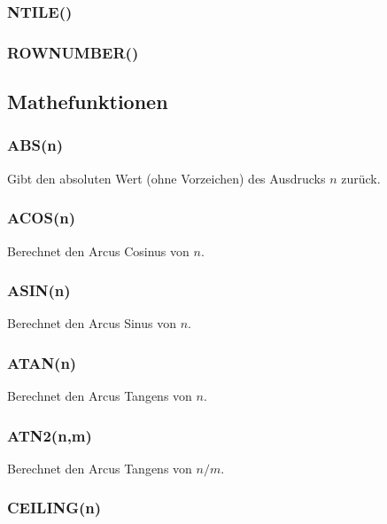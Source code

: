 \documentclass[12pt,ngerman,a4paper,index=totoc,twoside]{scrartcl}
\begin{document}
\subsubsection{NTILE()} 

\subsubsection{ROW\textunderscore NUMBER()} 

\subsection{Mathefunktionen}

\subsubsection{ABS(n)}

Gibt den absoluten Wert (ohne Vorzeichen) des Ausdrucks $n$ zurück.

\subsubsection{ACOS(n)}

Berechnet den Arcus Cosinus von $n$.

\subsubsection{ASIN(n)}

Berechnet den Arcus Sinus von $n$.

\subsubsection{ATAN(n)}

Berechnet den Arcus Tangens von $n$.

\subsubsection{ATN2(n,m)}

Berechnet den Arcus Tangens von $n/m$.

\subsubsection{CEILING(n)}
\end{document}
